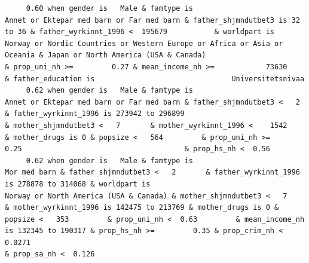 \documentclass[
  letterpaper,
  DIV=11,
  numbers=noendperiod]{scrreprt}
\begin{document}
\begin{verbatim}
     0.60 when gender is   Male & famtype is                        Annet or Ektepar med barn or Far med barn & father_shjmndutbet3 is 32 to 36 & father_wyrkinnt_1996 <  195679           & worldpart is                   Norway or Nordic Countries or Western Europe or Africa or Asia or Oceania & Japan or North America (USA & Canada)                                                                                                                            & prop_uni_nh >=         0.27 & mean_income_nh >=            73630                                                                                                                                                                                                                                                  & father_education is                                Universitetsnivaa                    
     0.62 when gender is   Male & famtype is                        Annet or Ektepar med barn or Far med barn & father_shjmndutbet3 <   2       & father_wyrkinnt_1996 is 273942 to 296899                                                                                                                                                    & mother_shjmndutbet3 <   7       & mother_wyrkinnt_1996 <    1542           & mother_drugs is 0 & popsize <   564         & prop_uni_nh >=         0.25                                      & prop_hs_nh <  0.56                                                                                                                                                                                                                                                                                                                       
     0.62 when gender is   Male & famtype is                                                     Mor med barn & father_shjmndutbet3 <   2       & father_wyrkinnt_1996 is 278878 to 314068 & worldpart is                                                                                              Norway or North America (USA & Canada) & mother_shjmndutbet3 <   7       & mother_wyrkinnt_1996 is 142475 to 213769 & mother_drugs is 0 & popsize <   353         & prop_uni_nh <  0.63         & mean_income_nh is 132345 to 190317 & prop_hs_nh >=         0.35 & prop_crim_nh <  0.0271                                                                                                                  & prop_sa_nh <  0.126                                                                                                                                               

\end{verbatim}
\end{document}
